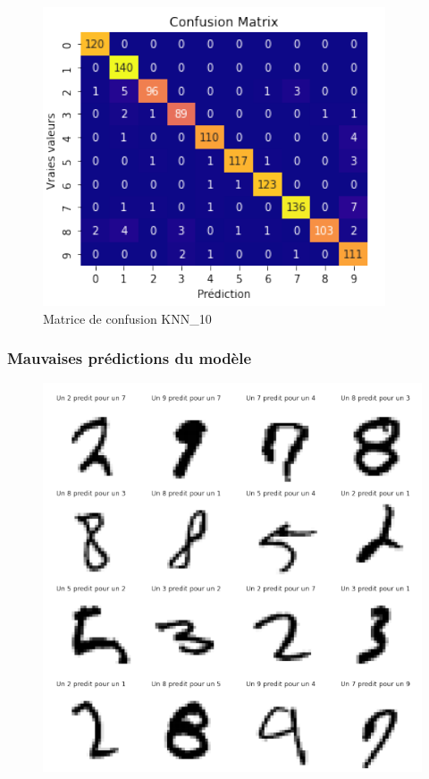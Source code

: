 \documentclass{beamer}
\theoremstyle{definition}
\begin{document}
\begin{frame}
\begin{minipage}[c]{1\linewidth}
\begin{minipage}[c]{0.5\linewidth}
\begin{figure}
		\end{figure}\end{minipage}\hfill 
		\begin{minipage}[c]{0.48\linewidth}\centering\begin{figure}
				\begin{center}
					\includegraphics[width=1\linewidth]{3.png}			
					\caption*{Matrice de confusion KNN\_10}
				\end{center}
				
		\end{figure}\end{minipage}
	\end{minipage}	
\end{frame}

\begin{frame}
	\frametitle{Mauvaises prédictions du modèle}
	\begin{figure}
		\centering
		\includegraphics[width=0.55\linewidth]{4.png}\\[0.25cm] 
		
	\end{figure}
\end{frame}
\end{document}
